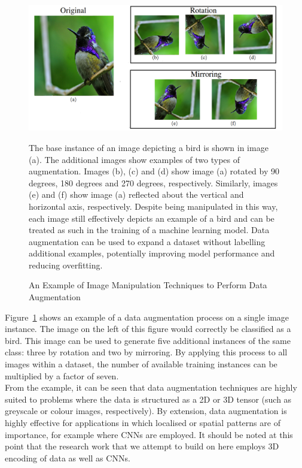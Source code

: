 \begin{figure}[h]
	\centering
	\includegraphics[scale=0.3]{Figures/data_augmentation2.png}
	
	\caption{An Example of Image Manipulation Techniques to Perform Data Augmentation} {The base instance of an image depicting a bird is shown in image (a). The additional images show examples of two types of augmentation. Images (b), (c) and (d) show image (a) rotated by 90 degrees, 180 degrees and 270 degrees, respectively. Similarly, images (e) and (f) show image (a) reflected about the vertical and horizontal axis, respectively. Despite being manipulated in this way, each image still effectively depicts an example of a bird and can be treated as such in the training of a machine learning model. Data augmentation can be used to expand a dataset without labelling additional examples, potentially improving model performance and reducing overfitting.}
	
	\label{fig:data_augmentation}
\end{figure}

\noindent
Figure~\ref{fig:data_augmentation} shows an example of a data augmentation process on a single image instance. The image on the left of this figure would correctly be classified as a bird. This image can be used to generate five additional instances of the same class: three by rotation and two by mirroring. By applying this process to all images within a dataset, the number of available training instances can be multiplied by a factor of seven.
\\

\noindent
From the example, it can be seen that data augmentation techniques are highly suited to problems where the data is structured as a 2D or 3D tensor (such as greyscale or colour images, respectively). By extension, data augmentation is highly effective for applications in which localised or spatial patterns are of importance, for example where CNNs are employed. It should be noted at this point that the research work that we attempt to build on here employs 3D encoding of data as well as CNNs. 


